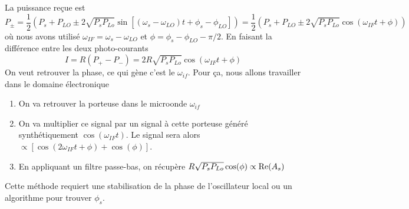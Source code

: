  La puissance reçue est
\begin{equation}
{P_ \pm } = \frac{1}{2}\left( {{P_s} + {P_{LO}} \pm 2\sqrt {{P_s}{P_{Lo}}} \sin [({\omega _s} - {\omega _{LO}})t + {\phi _s} - {\phi _{LO}}]} \right) = \frac{1}{2}\left( {{P_s} + {P_{LO}} \pm 2\sqrt {{P_s}{P_{Lo}}} \cos ({\omega _{IF}}t + \phi )} \right)
\end{equation}
où nous avons utilisé ${\omega _{IF}} = {\omega _s} - {\omega _{LO}}$ et 
$\phi  = {\phi _s} - {\phi _{LO}} - \pi /2$. En faisant la différence entre les deux photo-courants
\begin{equation}
I = R\left( {{P_ + } - {P_ - }} \right) = 2R\sqrt {{P_s}{P_{Lo}}} \cos ({\omega _{IF}}t + \phi )
\end{equation}
On veut retrouver la phase, ce qui gène c'est le $\omega_{if}$. Pour ça, nous allons travailler
dans le domaine électronique
\begin{enumerate}
\item On va retrouver la porteuse dans le microonde $\omega_{if}$
\item On va multiplier ce signal par un signal à cette porteuse généré synthétiquement 
$\cos(\omega_{IF}t)$. Le signal sera alors $\propto \left[ {\cos (2{\omega _{IF}}t + \phi ) + \cos (\phi )} \right]$. 
\item En appliquant un filtre passe-bas, on récupère $R\sqrt {{P_s}{P_{Lo}}} \cos (\phi ) \propto {\mathop{\rm Re}\nolimits} ({A_s})$
\end{enumerate}
Cette méthode requiert une stabilisation de la phase de l'oscillateur local ou un algorithme
pour trouver $\phi_s$.\\



